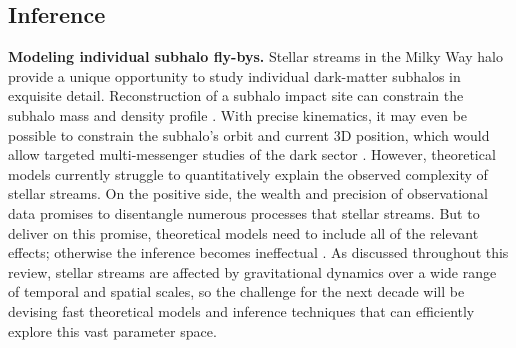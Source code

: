 \documentclass[final,5p,times,twocolumn,authoryear]{elsarticle}
\begin{document}
\subsection{Inference}
\textbf{Modeling individual subhalo fly-bys.}
Stellar streams in the Milky Way halo provide a unique opportunity to study individual dark-matter subhalos in exquisite detail.
Reconstruction of a subhalo impact site can constrain the subhalo mass and density profile \citep{erkal:2015b, bonaca:2019, hilmi:2024}.
With precise kinematics, it may even be possible to constrain the subhalo's orbit and current 3D position, which would allow targeted multi-messenger studies of the dark sector \citep{bonaca:2020, mirabal:2021}.
However, theoretical models currently struggle to quantitatively explain the observed complexity of stellar streams.
On the positive side, the wealth and precision of observational data promises to disentangle numerous processes that  stellar streams.
But to deliver on this promise, theoretical models need to include all of the relevant effects; otherwise the inference becomes ineffectual \citep[e.g., the power-spectrum of the GD-1 density can be separately reproduced both by internal epicyclic overdensities and external impacts of dark-matter subhalos, molecular clouds and spiral arms, cf.][]{ibata:2020, banik:2021}.
As discussed throughout this review, stellar streams are affected by gravitational dynamics over a wide range of temporal and spatial scales, so the challenge for the next decade will be devising fast theoretical models and inference techniques that can efficiently explore this vast parameter space.
\end{document}
